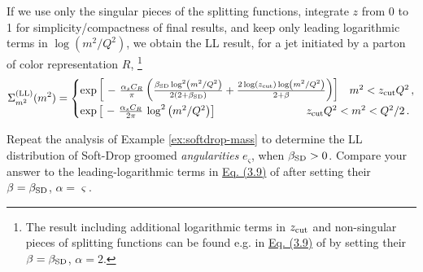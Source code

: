 \begin{example}
    If we use only the singular pieces of the splitting functions, integrate \(z\) from 0 to 1 for simplicity/compactness of final results, and keep only leading logarithmic terms in \(\log(m^2/Q^2)\), we obtain the LL result, for a jet initiated by a parton of color representation \(R\),%
    \footnote{
        The result including additional logarithmic terms in \(z_{\rm cut}\) and non-singular pieces of splitting functions can be found e.g. in \href{https://arxiv.org/pdf/1402.2657\#equation.3.9}{Eq. (3.9)} of  by setting their \(\beta = \beta_\text{SD}\), \(\alpha = 2\).
    }
    \begin{align}
        \label{eq:ll-sd-mass}
        \Sigma^{\rm(LL)}_{m^2}(m^2)
        =
        \begin{cases}
            \exp\le[
                ~-~
                \frac{\alpha_s C_R}{\pi}
                \le(
                    \frac{\betasd \log^2\le(m^2 / Q^2\ri)}
                        {2(2 + \betasd)}
                    +
                    \frac{2 \log(\zcut)\log(m^2/Q^2)}
                        {2 + \beta}
                \ri)
            \ri]
            &
            m^2 < \zcut Q^2
            \,,
            \\
            \exp\le[
                ~-~
                \frac{\alpha_s C_R}{2\pi}
                \,
                \log^2\le(m^2 / Q^2\ri)
            \ri]
            &
            \hspace{-40pt}
            \zcut Q^2 < m^2 < Q^2 / 2
            \,.
        \end{cases}
    \end{align}
\end{example}




\begin{exercise}
    \label{ex:soft-drop-gecf}
    Repeat the analysis of Example \ref{ex:softdrop-mass} to determine the LL distribution of Soft-Drop groomed \textit{angularities} \(e_\varsigma\), when \(\beta_\text{SD} > 0\).
    Compare your answer to the leading-logarithmic terms in \href{https://arxiv.org/pdf/1402.2657#equation.3.9}{Eq. (3.9)} of  after setting their \(\beta = \beta_\text{SD}\), \(\alpha = \varsigma\).
\end{exercise}


